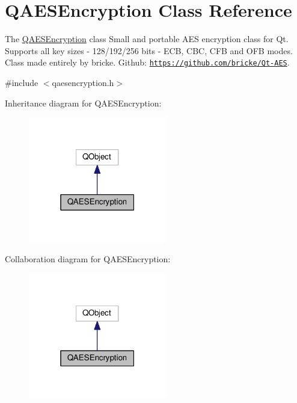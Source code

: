 \hypertarget{class_q_a_e_s_encryption}{}\section{Q\+A\+E\+S\+Encryption Class Reference}
\label{class_q_a_e_s_encryption}


The \hyperlink{class_q_a_e_s_encryption}{Q\+A\+E\+S\+Encryption} class Small and portable A\+ES encryption class for Qt. Supports all key sizes -\/ 128/192/256 bits -\/ E\+CB, C\+BC, C\+FB and O\+FB modes. Class made entirely by bricke. Github\+: \href{https://github.com/bricke/Qt-AES}{\tt https\+://github.\+com/bricke/\+Qt-\/\+A\+ES}.  




{\ttfamily \#include $<$qaesencryption.\+h$>$}



Inheritance diagram for Q\+A\+E\+S\+Encryption\+:
\nopagebreak
\begin{figure}[H]
\begin{center}
\leavevmode
\includegraphics[width=171pt]{class_q_a_e_s_encryption__inherit__graph}
\end{center}
\end{figure}


Collaboration diagram for Q\+A\+E\+S\+Encryption\+:
\nopagebreak
\begin{figure}[H]
\begin{center}
\leavevmode
\includegraphics[width=171pt]{class_q_a_e_s_encryption__coll__graph}
\end{center}
\end{figure}

